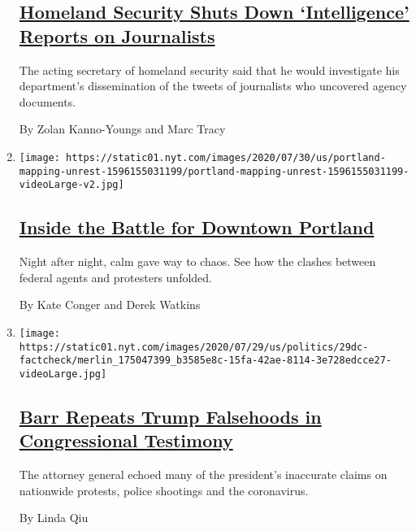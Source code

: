 \begin{enumerate}
  \hypertarget{homeland-security-shuts-down-intelligence-reports-on-journalists}{%
  \subsection{\texorpdfstring{\href{/2020/07/31/us/politics/homeland-security-portland.html}{Homeland
  Security Shuts Down `Intelligence' Reports on
  Journalists}}{Homeland Security Shuts Down `Intelligence' Reports on Journalists}}\label{homeland-security-shuts-down-intelligence-reports-on-journalists}}

  The acting secretary of homeland security said that he would
  investigate his department's dissemination of the tweets of
  journalists who uncovered agency documents.

  By Zolan Kanno-Youngs and Marc Tracy
\item
  \texttt{[image: https://static01.nyt.com/images/2020/07/30/us/portland-mapping-unrest-1596155031199/portland-mapping-unrest-1596155031199-videoLarge-v2.jpg]}

  \hypertarget{inside-the-battle-for-downtown-portland}{%
  \subsection{\texorpdfstring{\href{/interactive/2020/07/31/us/portland-protests-map-photos.html}{Inside
  the Battle for Downtown
  Portland}}{Inside the Battle for Downtown Portland}}\label{inside-the-battle-for-downtown-portland}}

  Night after night, calm gave way to chaos. See how the clashes between
  federal agents and protesters unfolded.

  By Kate Conger and Derek Watkins
\item
  \texttt{[image: https://static01.nyt.com/images/2020/07/29/us/politics/29dc-factcheck/merlin\_175047399\_b3585e8c-15fa-42ae-8114-3e728edcce27-videoLarge.jpg]}

  \hypertarget{barr-repeats-trump-falsehoods-in-congressional-testimony}{%
  \subsection{\texorpdfstring{\href{/2020/07/29/us/politics/barr-trump-factcheck-congressional-testimony.html}{Barr
  Repeats Trump Falsehoods in Congressional
  Testimony}}{Barr Repeats Trump Falsehoods in Congressional Testimony}}\label{barr-repeats-trump-falsehoods-in-congressional-testimony}}

  The attorney general echoed many of the president's inaccurate claims
  on nationwide protests, police shootings and the coronavirus.

  By Linda Qiu
\end{enumerate}


